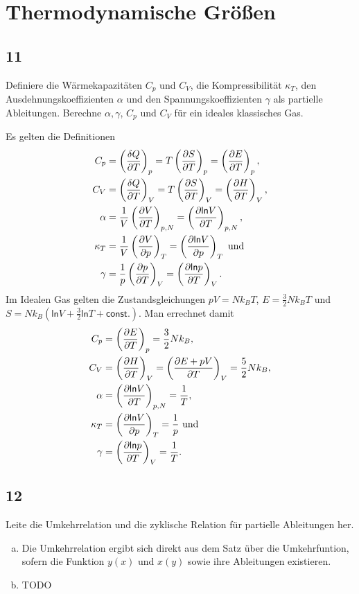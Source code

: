 \documentclass[12pt,a4paper]{report}
\newcommand{\logn}{\mathsf{ln}}
\newcommand{\partddd}[3]{\ensuremath {\left(\frac{\partial #1}{\partial #2}}\right)_{#3}}
\newenvironment{myfrag}{\begin{it}}{\end{it}\vspace{3mm}\par}
\numberwithin{equation}{section}
\begin{document}
\section{Thermodynamische Größen}
\subsection{11}
\begin{myfrag}
Definiere die Wärmekapazitäten $C_p$ und $C_V$, die Kompressibilität $\kappa_T$, den
Ausdehnungskoeffizienten $\alpha$ und den Spannungskoeffizienten $\gamma$ als
partielle Ableitungen. Berechne $\alpha, \gamma$, $C_p$ und $C_V$ für ein ideales
klassisches Gas.
\end{myfrag}
Es gelten die Definitionen
\begin{align}
	C_p&=\left(\frac{\delta Q}{\partial T}\right)_p=T\partddd{S}{T}{p}=\partddd{E}{T}{p},\\
	C_V&=\left(\frac{\delta Q}{\partial T}\right)_V=T\partddd{S}{T}{V}=\partddd{H}{T}{V},\\
	\alpha&=\frac{1}{V}\partddd{V}{T}{p, N}=\partddd{\logn V}{T}{p, N},\\
	\kappa_T&=\frac{1}{V}\partddd{V}{p}{T}=\partddd{\logn V}{p}{T}\text{ und}\\
	\gamma&=\frac{1}{p}\partddd{p}{T}{V}=\partddd{\logn p}{T}{V}.
\end{align}
Im Idealen Gas gelten die Zustandsgleichungen $pV=Nk_BT$, $E=\frac{3}{2}Nk_BT$ und $S=Nk_B\left(\logn V+\frac{3}{2}\logn T+\mathsf{const.}\right)$. Man errechnet damit
\begin{align}
	C_p&=\partddd{E}{T}{p}=\frac{3}{2}Nk_B,\\
	C_V&=\partddd{H}{T}{V}=\partddd{E+pV}{T}{V}=\frac{5}{2}Nk_B,\\
	\alpha&=\partddd{\logn V}{T}{p, N}=\frac{1}{T},\\
	\kappa_T&=\partddd{\logn V}{p}{T}=\frac{1}{p}\text{ und}\\
	\gamma&=\partddd{\logn p}{T}{V}=\frac{1}{T}.
\end{align}

\subsection{12}
\begin{myfrag}
Leite die Umkehrrelation und die zyklische Relation für partielle
Ableitungen her.
\end{myfrag}
\begin{enumerate}[(a)]
\item Die Umkehrrelation ergibt sich direkt aus dem Satz über die Umkehrfuntion, sofern die Funktion $y(x)$ und $x(y)$ sowie ihre Ableitungen existieren.
\item TODO
\end{enumerate}
\end{document}
